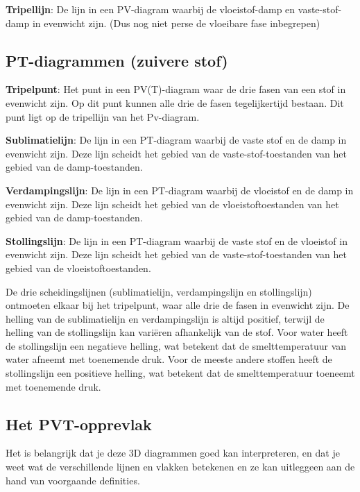 \begin{definition}
    \textbf{Tripellijn}: De lijn in een PV-diagram waarbij de vloeistof-damp en vaste-stof-damp in evenwicht zijn. (Dus nog niet perse de vloeibare fase inbegrepen)
\end{definition}
\subsection{PT-diagrammen (zuivere stof)}
\begin{definition}
    \textbf{Tripelpunt}: Het punt in een PV(T)-diagram waar de drie fasen van een stof in evenwicht zijn. Op dit punt kunnen alle drie de fasen tegelijkertijd bestaan. Dit punt ligt op de tripellijn van het Pv-diagram.
\end{definition}
\medskip
\begin{definition}
    \textbf{Sublimatielijn}: De lijn in een PT-diagram waarbij de vaste stof en de damp in evenwicht zijn. Deze lijn scheidt het gebied van de vaste-stof-toestanden van het gebied van de damp-toestanden.
\end{definition}
\medskip
\begin{definition}
    \textbf{Verdampingslijn}: De lijn in een PT-diagram waarbij de vloeistof en de damp in evenwicht zijn. Deze lijn scheidt het gebied van de vloeistoftoestanden van het gebied van de damp-toestanden.
\end{definition}
\medskip
\begin{definition}
    \textbf{Stollingslijn}: De lijn in een PT-diagram waarbij de vaste stof en de vloeistof in evenwicht zijn. Deze lijn scheidt het gebied van de vaste-stof-toestanden van het gebied van de vloeistoftoestanden.
\end{definition}
De drie scheidingslijnen (sublimatielijn, verdampingslijn en stollingslijn) ontmoeten elkaar bij het tripelpunt, waar alle drie de fasen in evenwicht zijn.
De helling van de sublimatielijn en verdampingslijn is altijd positief, terwijl de helling van de stollingslijn kan variëren afhankelijk van de stof.
Voor water heeft de stollingslijn een negatieve helling, wat betekent dat de smelttemperatuur van water afneemt met toenemende druk.
Voor de meeste andere stoffen heeft de stollingslijn een positieve helling, wat betekent dat de smelttemperatuur toeneemt met toenemende druk.

\subsection{Het PVT-opprevlak}
Het is belangrijk dat je deze 3D diagrammen goed kan interpreteren, en dat je weet wat de verschillende lijnen en vlakken betekenen en ze kan uitleggeen aan de hand van voorgaande definities.

